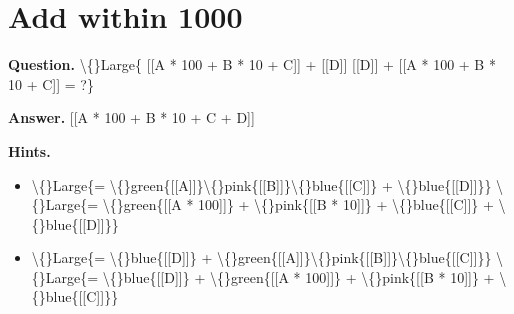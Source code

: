 \documentclass{article}
\begin{document}
\section*{Add within 1000}
\textbf{Question.} \textbackslash\{\}Large\{
                        [[A * 100 + B * 10 + C]] + [[D]]
                        [[D]] + [[A * 100 + B * 10 + C]]
                    = ?\}

\textbf{Answer.} [[A * 100 + B * 10 + C + D]]

\textbf{Hints.}
\begin{itemize}
  \item \textbackslash\{\}Large\{= \textbackslash\{\}green\{[[A]]\}\textbackslash\{\}pink\{[[B]]\}\textbackslash\{\}blue\{[[C]]\} + \textbackslash\{\}blue\{[[D]]\}\}
                        \textbackslash\{\}Large\{= \textbackslash\{\}green\{[[A * 100]]\} + \textbackslash\{\}pink\{[[B * 10]]\} + \textbackslash\{\}blue\{[[C]]\} + \textbackslash\{\}blue\{[[D]]\}\}
  \item \textbackslash\{\}Large\{= \textbackslash\{\}blue\{[[D]]\} + \textbackslash\{\}green\{[[A]]\}\textbackslash\{\}pink\{[[B]]\}\textbackslash\{\}blue\{[[C]]\}\}
                            \textbackslash\{\}Large\{= \textbackslash\{\}blue\{[[D]]\} + \textbackslash\{\}green\{[[A * 100]]\} + \textbackslash\{\}pink\{[[B * 10]]\} + \textbackslash\{\}blue\{[[C]]\}\}
                        

\end{itemize}
\end{document}
